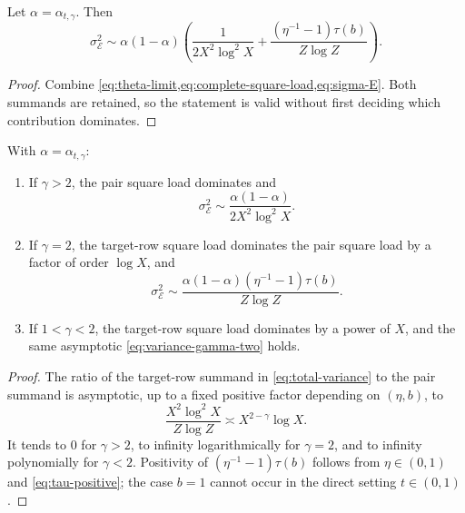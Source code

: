 \begin{proposition}
\label{prop:variance-regimes}
Let $\alpha=\alpha_{t,\gamma}$.  Then
\begin{equation}
\label{eq:total-variance}
 \sigma_{\mathcal E}^2
 \sim \alpha(1-\alpha)
 \left(
  \frac1{2X^2\log^2X}
  +\frac{(\eta^{-1}-1)\tau(b)}{Z\log Z}
 \right).
\end{equation}
\end{proposition}

\begin{proof}
Combine \cref{eq:theta-limit,eq:complete-square-load,eq:sigma-E}.  Both summands are retained, so the statement is valid without first deciding which contribution dominates.
\end{proof}

\begin{corollary}
\label{cor:variance-regimes}
With $\alpha=\alpha_{t,\gamma}$:
\begin{enumerate}[label=(\Alph*)]
\item If $\gamma>2$, the pair square load dominates and
\begin{equation}
\label{eq:variance-gamma-large}
 \sigma_{\mathcal E}^2
 \sim\frac{\alpha(1-\alpha)}{2X^2\log^2X}.
\end{equation}
\item If $\gamma=2$, the target-row square load dominates the pair square load by a factor of order $\log X$, and
\begin{equation}
\label{eq:variance-gamma-two}
 \sigma_{\mathcal E}^2
 \sim\frac{\alpha(1-\alpha)(\eta^{-1}-1)\tau(b)}{Z\log Z}.
\end{equation}
\item If $1<\gamma<2$, the target-row square load dominates by a power of $X$, and the same asymptotic \cref{eq:variance-gamma-two} holds.
\end{enumerate}
\end{corollary}

\begin{proof}
The ratio of the target-row summand in \cref{eq:total-variance} to the pair summand is asymptotic, up to a fixed positive factor depending on $(\eta,b)$, to
\[
 \frac{X^2\log^2X}{Z\log Z}
 \asymp X^{2-\gamma}\log X.
\]
It tends to $0$ for $\gamma>2$, to infinity logarithmically for $\gamma=2$, and to infinity polynomially for $\gamma<2$.  Positivity of $(\eta^{-1}-1)\tau(b)$ follows from $\eta\in(0,1)$ and \cref{eq:tau-positive}; the case $b=1$ cannot occur in the direct setting $t\in(0,1)$.
\end{proof}

